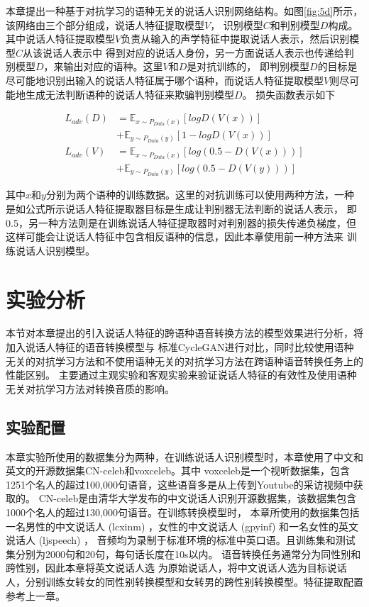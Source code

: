 本章提出一种基于对抗学习的语种无关的说话人识别网络结构。如图\ref{fig:5d}所示，该网络由三个部分组成，说话人特征提取模型$V$，
识别模型$C$和判别模型$D$构成。其中说话人特征提取模型$V$负责从输入的声学特征中提取说话人表示，然后识别模型$C$从该说话人表示中
得到对应的说话人身份，另一方面说话人表示也传递给判别模型$D$，来输出对应的语种。这里$V$和$D$是对抗训练的，
即判别模型$D$的目标是尽可能地识别出输入的说话人特征属于哪个语种，而说话人特征提取模型$V$则尽可能地生成无法判断语种的说话人特征来欺骗判别模型$D$。
损失函数表示如下


\begin{align}
    L_{adv}(D) & =\mathbb{E}_{x\sim P_{Data}(x)}\left[log D(V(x))\right] \\
               & +\mathbb{E}_{y\sim P_{Data}(y)}\left[1-log D(V(x))\right]\\
    L_{adv}(V) & =\mathbb{E}_{x\sim P_{Data}(x)}\left[log (0.5-D(V(x)))\right] \\
               & +\mathbb{E}_{y\sim P_{Data}(y)}\left[log (0.5-D(V(y)))\right]
\end{align}

其中$x$和$y$分别为两个语种的训练数据。这里的对抗训练可以使用两种方法，一种是如公式所示说话人特征提取器目标是生成让判别器无法判断的说话人表示，
即0.5，另一种方法则是在训练说话人特征提取器时对判别器的损失传递负梯度，但这样可能会让说话人特征中包含相反语种的信息，因此本章使用前一种方法来
训练说话人识别模型。

\section{实验分析}
本节对本章提出的引入说话人特征的跨语种语音转换方法的模型效果进行分析，将加入说话人特征的语音转换模型与
标准CycleGAN进行对比，同时比较使用语种无关的对抗学习方法和不使用语种无关的对抗学习方法在跨语种语音转换任务上的性能区别。
主要通过主观实验和客观实验来验证说话人特征的有效性及使用语种无关对抗学习方法对转换音质的影响。
\subsection{实验配置}
本章实验所使用的数据集分为两种，在训练说话人识别模型时，本章使用了中文和英文的开源数据集CN-celeb和voxceleb。其中
voxceleb是一个视听数据集，包含1251个名人的超过100,000句语音，这些语音多是从上传到Youtube的采访视频中获取的。
CN-celeb是由清华大学发布的中文说话人识别开源数据集，该数据集包含1000个名人的超过130,000句语音。在训练转换模型时，
本章所使用的数据集包括一名男性的中文说话人 (lcxinm) ，女性的中文说话人 (gpyinf) 和一名女性的英文说话人 (ljspeech) ，
音频均为录制于标准环境的标准中英口语。且训练集和测试集分别为2000句和20句，每句话长度在10s以内。
语音转换任务通常分为同性别和跨性别，因此本章将英文说话人选
为原始说话人，将中文说话人选为目标说话人，分别训练女转女的同性别转换模型和女转男的跨性别转换模型。特征提取配置参考上一章。

